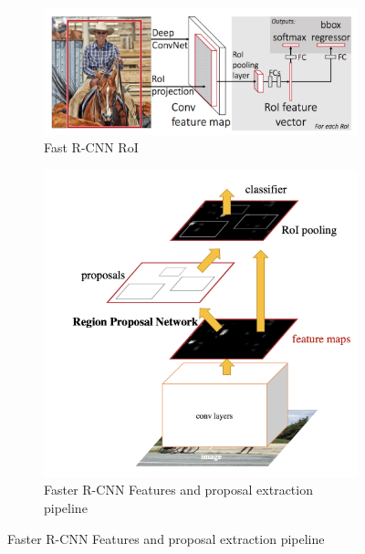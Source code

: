 \documentclass[12pt, a4paper]{article}
\begin{document}
\begin{figure}[h]
\begin{minipage}[t]{0.55\textwidth}
    \begin{figure}[H]
        \centering
        \includegraphics[width=\linewidth]{pictures/frcnn.png}
        \caption{Fast R-CNN RoI}
        \label{fig:frcc_pipe}
    \end{figure}
\end{minipage}
\hfill
\begin{minipage}[t]{0.4\textwidth}
    \begin{figure}[H]
        \centering
        \includegraphics[width=\linewidth]{pictures/faster_rcnn.png}
        \caption{Faster R-CNN Features and proposal extraction pipeline}
        \label{fig:faster_rcnn}
    \end{figure}
\end{minipage}
\end{figure}
\end{document}
